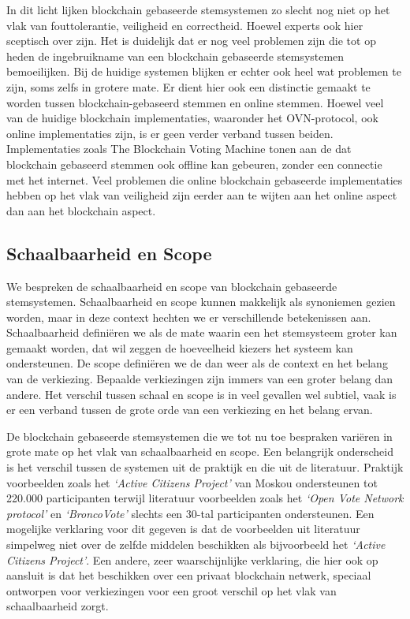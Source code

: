 	 In dit licht lijken blockchain gebaseerde stemsystemen zo slecht nog niet op het vlak van fouttolerantie, veiligheid en correctheid. Hoewel experts ook hier sceptisch over zijn. Het is duidelijk dat er nog veel problemen zijn die tot op heden de ingebruikname van een blockchain gebaseerde stemsystemen bemoeilijken. Bij de huidige systemen blijken er echter ook heel wat problemen te zijn, soms zelfs in grotere mate. Er dient hier ook een distinctie gemaakt te worden tussen blockchain-gebaseerd stemmen en online stemmen. Hoewel veel van de huidige blockchain implementaties, waaronder het OVN-protocol, ook online implementaties zijn, is er geen verder verband tussen beiden. Implementaties zoals The Blockchain Voting Machine tonen aan de dat blockchain gebaseerd stemmen ook offline kan gebeuren, zonder een connectie met het internet. Veel problemen die online blockchain gebaseerde implementaties hebben op het vlak van veiligheid zijn eerder aan te wijten aan het online aspect dan aan het blockchain aspect.
	 
	\subsection{Schaalbaarheid en Scope}
	We bespreken de schaalbaarheid en scope van blockchain gebaseerde stemsystemen. Schaalbaarheid en scope kunnen makkelijk als synoniemen gezien worden, maar in deze context hechten we er verschillende betekenissen aan. Schaalbaarheid definiëren we als de mate waarin een het stemsysteem groter kan gemaakt worden, dat wil zeggen de hoeveelheid kiezers het systeem kan ondersteunen. De scope definiëren we de dan weer als de context en het belang van de verkiezing. Bepaalde verkiezingen zijn immers van een groter belang dan andere. Het verschil tussen schaal en scope is in veel gevallen wel subtiel, vaak is er een verband tussen de grote orde van een verkiezing en het belang ervan.
	
	De blockchain gebaseerde stemsystemen die we tot nu toe bespraken variëren in grote mate op het vlak van schaalbaarheid en scope. Een belangrijk onderscheid is het verschil tussen de systemen uit de praktijk en die uit de literatuur. Praktijk voorbeelden zoals het  \textit{`Active Citizens Project'} van Moskou ondersteunen tot 220.000 participanten terwijl literatuur voorbeelden zoals het  \textit{`Open Vote Network protocol'} en  \textit{`BroncoVote'} slechts een 30-tal participanten ondersteunen. Een mogelijke verklaring voor dit gegeven is dat de voorbeelden uit literatuur simpelweg niet over de zelfde middelen beschikken als bijvoorbeeld het \textit{`Active Citizens Project'}. Een andere, zeer waarschijnlijke verklaring, die hier ook op aansluit is dat het beschikken over een privaat blockchain netwerk, speciaal ontworpen voor verkiezingen voor een groot verschil op het vlak van schaalbaarheid zorgt.
	
